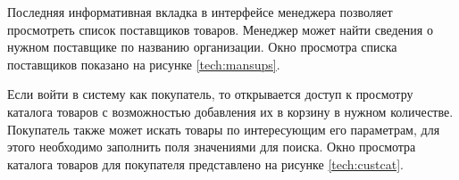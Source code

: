 Последняя информативная вкладка в интерфейсе менеджера позволяет просмотреть список поставщиков товаров. Менеджер может найти сведения о нужном поставщике по названию организации. Окно просмотра списка поставщиков показано на рисунке \ref{tech:mansups}.

\begin{figure}[H]
\end{figure}

Если войти в систему как покупатель, то открывается доступ к просмотру каталога товаров с возможностью добавления их в корзину в нужном количестве. Покупатель также может искать товары по интересующим его параметрам, для этого необходимо заполнить поля значениями для поиска. Окно просмотра каталога товаров для покупателя представлено на рисунке \ref{tech:custcat}.

\begin{figure}[H]
\end{figure}

